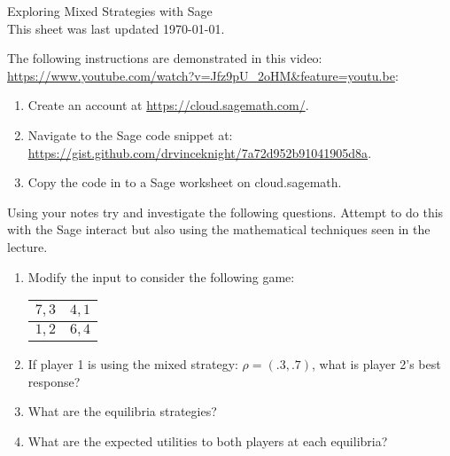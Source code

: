 \documentclass[12pt]{article}
\begin{document}
\begin{center}
\Huge{Exploring Mixed Strategies with Sage\\\tiny{This sheet was last updated \today.} }
\end{center}

The following instructions are demonstrated in this video: \url{https://www.youtube.com/watch?v=Jfz9pU_2oHM&feature=youtu.be}:

\begin{enumerate}
    \item Create an account at \url{https://cloud.sagemath.com/}.
    \item Navigate to the Sage code snippet at: \url{https://gist.github.com/drvinceknight/7a72d952b91041905d8a}.
    \item Copy the code in to a Sage worksheet on cloud.sagemath.
\end{enumerate}

Using your notes try and investigate the following questions. Attempt to do this with the Sage interact but also using the mathematical techniques seen in the lecture.


\begin{enumerate}
\item Modify the input to consider the following game:
\begin{center}
\begin{tabular}{|c|c|}
\hline
$7,3$&$4,1$\\\hline
$1,2$&$6,4$\\
\hline
\end{tabular}
\end{center}
\item If player 1 is using the mixed strategy: $\rho=(.3,.7)$, what is player 2's best response?
\item What are the equilibria strategies?
\item What are the expected utilities to both players at each equilibria?
\end{enumerate}
\end{document}
